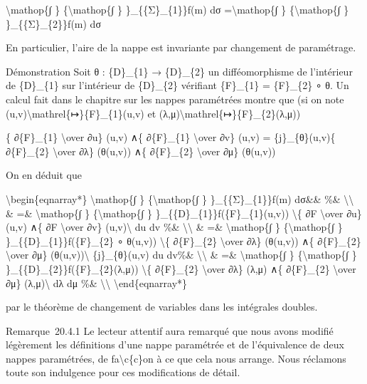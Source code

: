 \documentclass[]{article}
\begin{document}
\textbackslash{}mathop\{∫ \} \{\textbackslash{}mathop\{∫ \}
\}\_\{\{Σ\}\_\{1\}\}f(m) dσ =\textbackslash{}mathop\{∫ \}
\{\textbackslash{}mathop\{∫ \} \}\_\{\{Σ\}\_\{2\}\}f(m) dσ

En particulier, l'aire de la nappe est invariante par changement de
paramétrage.

Démonstration Soit θ : \{D\}\_\{1\} → \{D\}\_\{2\} un difféomorphisme de
l'intérieur de \{D\}\_\{1\} sur l'intérieur de \{D\}\_\{2\} vérifiant
\{F\}\_\{1\} = \{F\}\_\{2\} ∘ θ. Un calcul fait dans le chapitre sur les
nappes paramétrées montre que (si on note
(u,v)\textbackslash{}mathrel\{↦\}\{F\}\_\{1\}(u,v) et
(λ,μ)\textbackslash{}mathrel\{↦\}\{F\}\_\{2\}(λ,μ))

\{ ∂\{F\}\_\{1\} \textbackslash{}over ∂u\} (u,v) ∧\{ ∂\{F\}\_\{1\}
\textbackslash{}over ∂v\} (u,v) = \{j\}\_\{θ\}(u,v)\{ ∂\{F\}\_\{2\}
\textbackslash{}over ∂λ\} (θ(u,v)) ∧\{ ∂\{F\}\_\{2\}
\textbackslash{}over ∂μ\} (θ(u,v))

On en déduit que

\textbackslash{}begin\{eqnarray*\} \textbackslash{}mathop\{∫ \}
\{\textbackslash{}mathop\{∫ \} \}\_\{\{Σ\}\_\{1\}\}f(m) dσ\&\& \%\&
\textbackslash{}\textbackslash{} \& =\& \textbackslash{}mathop\{∫ \}
\{\textbackslash{}mathop\{∫ \} \}\_\{\{D\}\_\{1\}\}f(\{F\}\_\{1\}(u,v))
\textbackslash{}\textbar{}\{ ∂F \textbackslash{}over ∂u\} (u,v) ∧\{ ∂F
\textbackslash{}over ∂v\} (u,v)\textbackslash{}\textbar{} du dv \%\&
\textbackslash{}\textbackslash{} \& =\& \textbackslash{}mathop\{∫ \}
\{\textbackslash{}mathop\{∫ \} \}\_\{\{D\}\_\{1\}\}f(\{F\}\_\{2\} ∘
θ(u,v)) \textbackslash{}\textbar{}\{ ∂\{F\}\_\{2\} \textbackslash{}over
∂λ\} (θ(u,v)) ∧\{ ∂\{F\}\_\{2\} \textbackslash{}over ∂μ\}
(θ(u,v))\textbackslash{}\textbar{} \textbar{}\{j\}\_\{θ\}(u,v)\textbar{}
du dv\%\& \textbackslash{}\textbackslash{} \& =\&
\textbackslash{}mathop\{∫ \} \{\textbackslash{}mathop\{∫ \}
\}\_\{\{D\}\_\{2\}\}f(\{F\}\_\{2\}(λ,μ)) \textbackslash{}\textbar{}\{
∂\{F\}\_\{2\} \textbackslash{}over ∂λ\} (λ,μ) ∧\{ ∂\{F\}\_\{2\}
\textbackslash{}over ∂μ\} (λ,μ)\textbackslash{}\textbar{} dλ dμ \%\&
\textbackslash{}\textbackslash{} \textbackslash{}end\{eqnarray*\}

par le théorème de changement de variables dans les intégrales doubles.

Remarque~20.4.1 Le lecteur attentif aura remarqué que nous avons modifié
légèrement les définitions d'une nappe paramétrée et de l'équivalence de
deux nappes paramétrées, de fa\textbackslash{}c\{c\}on à ce que cela
nous arrange. Nous réclamons toute son indulgence pour ces modifications
de détail.
\end{document}
